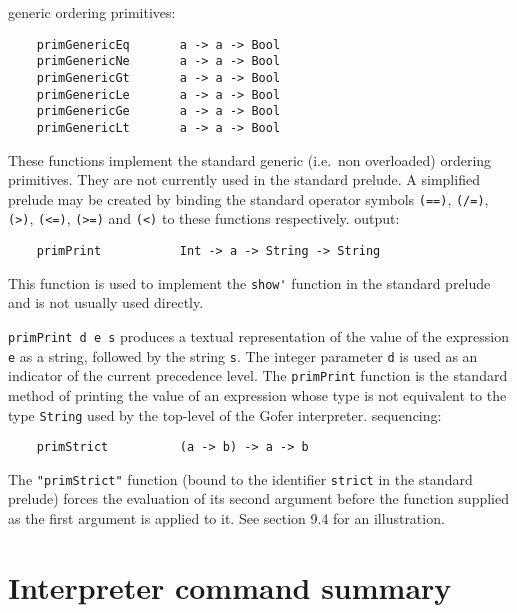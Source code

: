 \IT generic ordering primitives:
\begin{verbatim}
    primGenericEq       a -> a -> Bool
    primGenericNe       a -> a -> Bool
    primGenericGt       a -> a -> Bool
    primGenericLe       a -> a -> Bool
    primGenericGe       a -> a -> Bool
    primGenericLt       a -> a -> Bool
\end{verbatim}
    These functions implement the standard generic  (i.e.\  non
    overloaded) ordering primitives.  They are  not  currently
    used in the standard prelude.  A simplified prelude may be
    created by binding the  standard  operator  symbols  \verb"(==)",
    \verb"(/=)",  \verb"(>)",  \verb"(<=)",  \verb"(>=)"  
    and  \verb"(<)"  to   these   functions
    respectively.
\IT output:
\begin{verbatim}
    primPrint           Int -> a -> String -> String
\end{verbatim}
    This function is used to implement the \verb"show'"  function  in
    the standard prelude and is not usually used directly.

    \verb"primPrint d e s" produces a textual representation  of  the
    value of the expression \verb"e" as a  string,  followed  by  the
    string \verb"s".  The integer parameter \verb"d" is used as an indicator
    of the current precedence level.  The  \verb"primPrint"  function
    is the  standard  method  of  printing  the  value  of  an
    expression whose type is not equivalent to the type \verb"String"
    used by the top-level of the Gofer interpreter.
\IT sequencing:
\begin{verbatim}
    primStrict          (a -> b) -> a -> b
\end{verbatim}
    The \verb="primStrict"= function (bound to the identifier  \verb"strict"
    in the standard prelude)  forces  the  evaluation  of  its
    second argument before the function supplied as the  first
    argument is  applied  to  it.   See  section  9.4  for  an
    illustration.
\EI


%
%

\chapter{Interpreter command summary}

\BI
\IT
{}     

